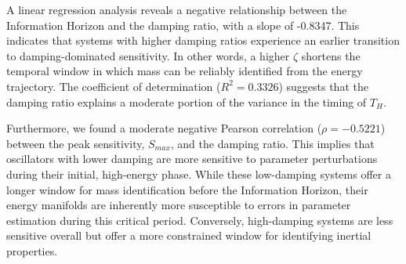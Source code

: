 \documentclass[]{article}
\begin{document}
A linear regression analysis reveals a negative relationship between the Information Horizon and the damping ratio, with a slope of -0.8347. This indicates that systems with higher damping ratios experience an earlier transition to damping-dominated sensitivity. In other words, a higher $\zeta$ shortens the temporal window in which mass can be reliably identified from the energy trajectory. The coefficient of determination ($R^2 = 0.3326$) suggests that the damping ratio explains a moderate portion of the variance in the timing of $T_H$.

Furthermore, we found a moderate negative Pearson correlation ($\rho = -0.5221$) between the peak sensitivity, $S_{max}$, and the damping ratio. This implies that oscillators with lower damping are more sensitive to parameter perturbations during their initial, high-energy phase. While these low-damping systems offer a longer window for mass identification before the Information Horizon, their energy manifolds are inherently more susceptible to errors in parameter estimation during this critical period. Conversely, high-damping systems are less sensitive overall but offer a more constrained window for identifying inertial properties.
\end{document}

